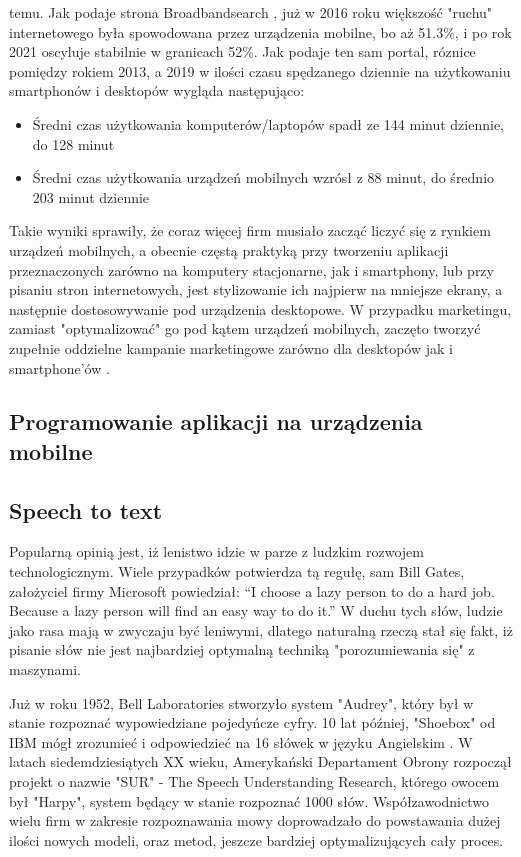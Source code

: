 \documentclass[12pt, a4paper]{article}
\begin{document}
\begin{sloppypar}
{{    temu. Jak podaje strona Broadbandsearch \cite{dvm}, już w 2016 roku większość "ruchu"
    internetowego była spowodowana przez urządzenia mobilne, bo aż 51.3\%, i po 
    rok 2021 oscyluje stabilnie w granicach 52\%. Jak podaje ten sam portal, róznice
    pomiędzy rokiem 2013, a 2019 w ilości czasu spędzanego dziennie na użytkowaniu
    smartphonów i desktopów wygląda następująco:
    \begin{itemize}
      \item Średni czas użytkowania komputerów/laptopów spadł ze 144 minut dziennie, do 128 minut
      \item Średni czas użytkowania urządzeń mobilnych wzrósł z 88 minut, do średnio 203 minut dziennie 
    \end{itemize} 
    Takie wyniki sprawiły, że coraz więcej firm musiało zacząć liczyć się z 
    rynkiem urządzeń mobilnych, a obecnie częstą praktyką przy tworzeniu aplikacji 
    przeznaczonych zarówno na komputery stacjonarne, jak i smartphony, lub przy 
    pisaniu stron internetowych, jest stylizowanie ich najpierw na mniejsze ekrany,
    a następnie dostosowywanie pod urządzenia desktopowe. W przypadku marketingu, 
    zamiast "optymalizować" go pod kątem urządzeń mobilnych, zaczęto tworzyć zupełnie
    oddzielne kampanie marketingowe zarówno dla desktopów jak i smartphone'ów
    \cite{mobile_strategy}.
  }
  \subsection{Programowanie aplikacji na urządzenia mobilne}
  {
    
  }
  \subsection{Speech to text}
  {
    Popularną opinią jest, iż lenistwo idzie w parze z ludzkim rozwojem 
    technologicznym. Wiele przypadków potwierdza tą regułę, sam Bill Gates, założyciel
    firmy Microsoft powiedział: 
    “I choose a lazy person to do a hard job. 
    Because a lazy person will find an easy way to do it.”
    W duchu tych słów, ludzie jako rasa mają w zwyczaju być leniwymi, dlatego
    naturalną rzeczą stał się fakt, iż pisanie słów nie jest najbardziej optymalną 
    techniką "porozumiewania się" z maszynami.
    
    Już w roku 1952, Bell Laboratories stworzyło system "Audrey", który był w stanie 
    rozpoznać wypowiedziane pojedyńcze cyfry. 10 lat później, "Shoebox" od IBM mógł 
    zrozumieć i odpowiedzieć na 16 słówek w języku Angielskim \cite{speech_history}.
    W latach siedemdziesiątych XX wieku, Amerykański Departament Obrony rozpoczął
    projekt o nazwie "SUR" - The Speech Understanding Research, którego owocem
    był "Harpy", system będący w stanie rozpoznać 1000 słów. Współzawodnictwo wielu
    firm w zakresie rozpoznawania mowy doprowadzało do powstawania dużej ilości nowych
    modeli, oraz metod, jeszcze bardziej optymalizujących cały proces.

}}
\end{sloppypar}
\end{document}
